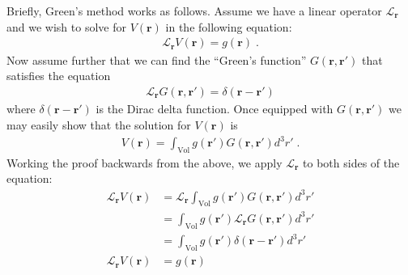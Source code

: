\documentclass[12pt]{article}
\renewcommand{\vec}[1]{\boldsymbol{#1}}
\begin{document}
Briefly, Green's method works as follows.  Assume we have a linear operator $\mathcal{L}_{\vec{r}}$ and we 
wish to solve for $V(\vec{r})$ in the following equation:
\begin{align}
 \mathcal{L}_{\vec{r}} V(\vec{r}) = g(\vec{r}) \;.
\end{align}
Now assume further that we can find the ``Green's function''
$G(\vec{r}, \vec{r}')$ that satisfies the equation
\begin{align}
\mathcal{L}_{\vec{r}} G(\vec{r}, \vec{r}') = \delta(\vec{r}-\vec{r}')
\end{align}
where $\delta(\vec{r}-\vec{r}')$ is the Dirac delta function.  Once equipped with $G(\vec{r}, \vec{r}')$ we may easily
show that the solution for $V(\vec{r})$ is
\begin{align}\label{eqn:useg}
V(\vec{r}) = \int_\text{Vol} g(\vec{r}')G(\vec{r}, \vec{r}') d^3 r'\;.
\end{align}
Working the proof backwards from the above, we apply $\mathcal{L}_{\vec{r}}$ to both sides of the equation:
\begin{align}
\mathcal{L}_{\vec{r}} V(\vec{r}) &= \mathcal{L}_{\vec{r}} \int_\text{Vol} g(\vec{r}')G(\vec{r}, \vec{r}')d^3 r' \\
&= \int_\text{Vol} g(\vec{r}')  \mathcal{L}_{\vec{r}} G(\vec{r}, \vec{r}') d^3 r' \\
    &= \int_\text{Vol} g(\vec{r}')  \delta(\vec{r} - \vec{r}') d^3 r' \\
    \mathcal{L}_{\vec{r}} V(\vec{r}) &= g(\vec{r})
\end{align}
\end{document}
